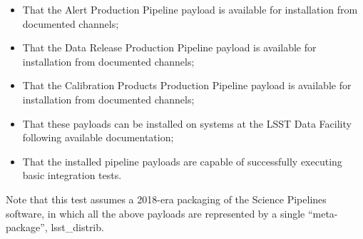 \documentclass[DM,lsstdraft,STR,toc]{lsstdoc}
\providecommand{\tightlist}{
  \setlength{\itemsep}{0pt}\setlength{\parskip}{0pt}}
\begin{document}
\begin{itemize}
\tightlist
\item
  That the Alert Production Pipeline payload is available for
  installation from documented channels;
\item
  That the Data Release Production Pipeline payload is available for
  installation from documented channels;
\item
  That the Calibration Products Production Pipeline payload is available
  for installation from documented channels;
\item
  That these payloads can be installed on systems at the LSST Data
  Facility following available documentation;
\item
  That the installed pipeline payloads are capable of successfully
  executing basic integration tests.
\end{itemize}

Note that this test assumes a 2018-era packaging of the Science
Pipelines software, in which all the above payloads are represented by a
single ``meta-package'', lsst\_distrib.
\end{document}
